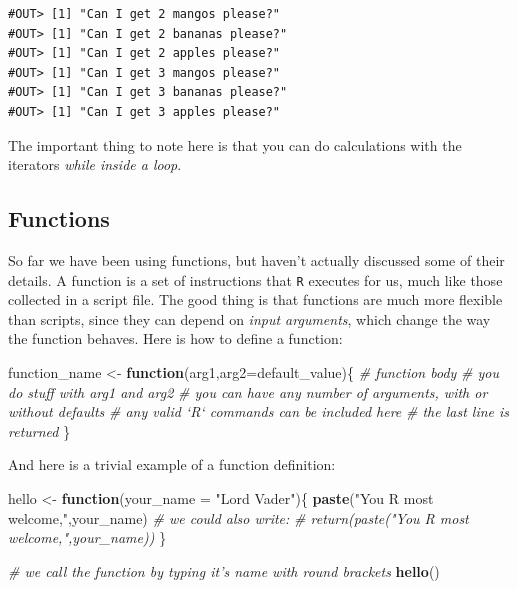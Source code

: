 \documentclass[]{book}
\newenvironment{Shaded}{\begin{snugshade}}{\end{snugshade}}
\newcommand{\CommentTok}[1]{\textcolor[rgb]{0.56,0.35,0.01}{\textit{#1}}}
\newcommand{\ControlFlowTok}[1]{\textcolor[rgb]{0.13,0.29,0.53}{\textbf{#1}}}
\newcommand{\DataTypeTok}[1]{\textcolor[rgb]{0.13,0.29,0.53}{#1}}
\newcommand{\KeywordTok}[1]{\textcolor[rgb]{0.13,0.29,0.53}{\textbf{#1}}}
\newcommand{\NormalTok}[1]{#1}
\newcommand{\StringTok}[1]{\textcolor[rgb]{0.31,0.60,0.02}{#1}}
\begin{document}
\begin{verbatim}
#OUT> [1] "Can I get 2 mangos please?"
#OUT> [1] "Can I get 2 bananas please?"
#OUT> [1] "Can I get 2 apples please?"
#OUT> [1] "Can I get 3 mangos please?"
#OUT> [1] "Can I get 3 bananas please?"
#OUT> [1] "Can I get 3 apples please?"
\end{verbatim}

The important thing to note here is that you can do calculations with the iterators \emph{while inside a loop}.

\hypertarget{functions}{%
\subsection{Functions}\label{functions}}

So far we have been using functions, but haven't actually discussed some of their details. A function is a set of instructions that \texttt{R} executes for us, much like those collected in a script file. The good thing is that functions are much more flexible than scripts, since they can depend on \emph{input arguments}, which change the way the function behaves. Here is how to define a function:

\begin{Shaded}
\begin{Highlighting}[]
\NormalTok{function_name <-}\StringTok{ }\ControlFlowTok{function}\NormalTok{(arg1,}\DataTypeTok{arg2=}\NormalTok{default_value)\{}
  \CommentTok{# function body}
  \CommentTok{# you do stuff with arg1 and arg2}
  \CommentTok{# you can have any number of arguments, with or without defaults}
  \CommentTok{# any valid `R` commands can be included here}
  \CommentTok{# the last line is returned}
\NormalTok{\}}
\end{Highlighting}
\end{Shaded}

And here is a trivial example of a function definition:

\begin{Shaded}
\begin{Highlighting}[]
\NormalTok{hello <-}\StringTok{ }\ControlFlowTok{function}\NormalTok{(}\DataTypeTok{your_name =} \StringTok{"Lord Vader"}\NormalTok{)\{}
  \KeywordTok{paste}\NormalTok{(}\StringTok{"You R most welcome,"}\NormalTok{,your_name)}
  \CommentTok{# we could also write:}
  \CommentTok{# return(paste("You R most welcome,",your_name))}
\NormalTok{\}}

\CommentTok{# we call the function by typing it's name with round brackets}
\KeywordTok{hello}\NormalTok{()}
\end{Highlighting}
\end{Shaded}
\end{document}
